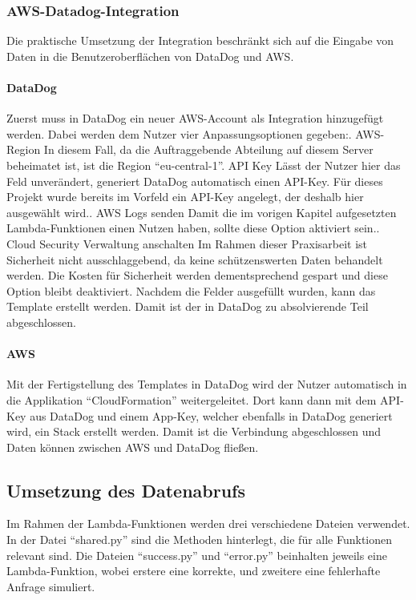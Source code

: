 	\subsubsection{AWS-Datadog-Integration}
	Die praktische Umsetzung der Integration beschränkt sich auf die Eingabe von Daten in die Benutzeroberflächen von DataDog und AWS.
	\paragraph{DataDog}
	Zuerst muss in DataDog ein neuer AWS-Account als Integration hinzugefügt werden. Dabei werden dem Nutzer vier Anpassungsoptionen gegeben:. AWS-Region\newline
	In diesem Fall, da die Auftraggebende Abteilung auf diesem Server beheimatet ist, ist die Region ``eu-central-1''. API Key\newline
	Lässt der Nutzer hier das Feld unverändert, generiert DataDog automatisch einen API-Key. Für dieses Projekt wurde bereits im Vorfeld ein API-Key angelegt, der deshalb hier ausgewählt wird.. AWS Logs senden\newline
	Damit die im vorigen Kapitel aufgesetzten Lambda-Funktionen einen Nutzen haben, sollte diese Option aktiviert sein.. Cloud Security Verwaltung anschalten\newline
	Im Rahmen dieser Praxisarbeit ist Sicherheit nicht ausschlaggebend, da keine schützenswerten Daten behandelt werden. Die Kosten für Sicherheit werden dementsprechend gespart und diese Option bleibt deaktiviert.\newline
	\newline
	Nachdem die Felder ausgefüllt wurden, kann das Template erstellt werden. Damit ist der in DataDog zu absolvierende Teil abgeschlossen. \newline
	\paragraph{AWS}
	Mit der Fertigstellung des Templates in DataDog wird der Nutzer automatisch in die Applikation ``CloudFormation'' weitergeleitet. Dort kann dann mit dem API-Key aus DataDog und einem App-Key, welcher ebenfalls in DataDog generiert wird, ein Stack erstellt werden. Damit ist die Verbindung abgeschlossen und Daten können zwischen AWS und DataDog fließen.
\subsection{Umsetzung des Datenabrufs}
	Im Rahmen der Lambda-Funktionen werden drei verschiedene Dateien verwendet. In der Datei ``shared.py'' sind die Methoden hinterlegt, die für alle Funktionen relevant sind. Die Dateien ``success.py'' und ``error.py'' beinhalten jeweils eine Lambda-Funktion, wobei erstere eine korrekte, und zweitere eine fehlerhafte Anfrage simuliert. 
